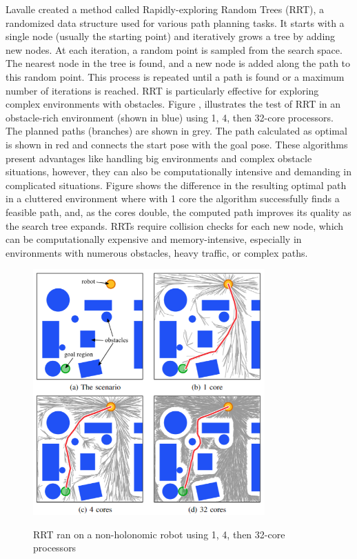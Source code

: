 Lavalle \cite{R47} created a method called Rapidly-exploring Random Trees (RRT), a randomized data structure used 
for various path planning tasks. It starts with a single node (usually the starting point)
and iteratively grows a tree by adding new nodes. At each iteration, a random point is sampled from 
the search space. The nearest node in the tree is found, and a new node is added along the path to 
this random point. This process is repeated until a path is found or a maximum number of iterations 
is reached. RRT is particularly effective for exploring complex environments with obstacles. 
Figure , illustrates the test of RRT in an obstacle-rich environment (shown in blue)
using 1, 4, then 32-core processors. The planned paths (branches) are shown in grey. 
The path calculated as optimal is shown in red and connects the start pose with the goal pose.
These algorithms present advantages like handling big environments and complex obstacle
situations, however, they can also be computationally intensive and demanding in complicated situations.
Figure  shows the difference in the resulting optimal path in a cluttered environment where with
1 core the algorithm successfully finds a feasible path, and, as the cores double, the computed path
improves its quality as the search tree expands. 
RRTs require collision checks for each new node, which can be computationally expensive and memory-intensive, 
especially in environments with numerous obstacles, heavy traffic, or complex paths.


\begin{figure}[H]
    \begin{center}
       \includegraphics[width=3.5in]{images/Chap1/sampling-based.png}\\
       \caption{RRT ran on a non-holonomic robot using 1, 4, then 32-core 
       processors \cite{R16}}
       \label{sampling-based}
       \end{center}
\end{figure}

